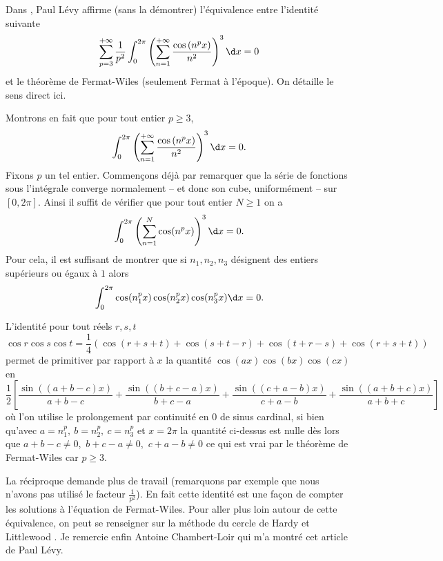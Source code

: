 \documentclass{notes}
\begin{document}

Dans \cite{Levy}, Paul Lévy affirme (sans la démontrer) l'équivalence entre l'identité suivante
\[ \sum_{p=3}^{+\infty} \frac{1}{p^{2}} \int_{0}^{2\pi} \left( \sum_{n=1}^{+\infty} \frac{\cos\left( n^{p }x \right)}{n^{2}} \right)^{3}  \d x = 0  \]
et le théorème de Fermat-Wiles (seulement Fermat à l'époque). On détaille le sens direct ici.

Montrons en fait que pour tout entier $p\geq 3$, 
\[ \int_{0}^{2\pi} \left( \sum_{n=1}^{+\infty} \frac{\cos\left( n^{p }x \right)}{n^{2}} \right)^{3}  \d x = 0 .  \]
Fixons $p$ un tel entier. Commençons déjà par remarquer que la série de fonctions sous l'intégrale converge normalement -- et donc son cube, uniformément -- sur $[0,2\pi]$. Ainsi il suffit de vérifier que pour tout entier $N\geq 1$ on a 
\[  \int_{0}^{2\pi}   \left( \sum_{n=1}^{N} \cos(n^{p}x) \right)^{3} \d x = 0. \]
Pour cela, il est suffisant de montrer que si $n_1,n_2,n_3$ désignent des entiers supérieurs ou égaux à $1$ alors 
\[ \int_{0}^{2\pi} \cos(n_1^{p} x)\cos(n_2^{p}x) \cos(n_3^{p}x) \d x = 0.\]

L'identité pour tout réels $r,s,t$ 
\[\cos r \cos s \cos t = \frac 14 \left( \cos(r+s+t)+\cos(s+t-r) + \cos(t+r-s) + \cos(r+s+t) \right)\]
permet de primitiver par rapport à $x$ la quantité $ \cos(ax)\cos(bx)\cos(cx) $  en 
\[ \frac 12 \left[    \frac{\sin \left( (a+b-c)x \right)  }{a+b-c} + \frac{\sin\left( (b+c-a)x \right)}{b+c-a}  + \frac{\sin\left( (c+a-b) x\right)  }{c+a-b} + \frac{\sin\left( (a+b+c)x \right)}{a+b+c}    \right] \]
où l'on utilise le prolongement par continuité en $0$ de sinus cardinal, si bien qu'avec $a=n_1^{p},\ b=n_2^{p},\ c=n_3^{p}$ et $x=2\pi$ la quantité ci-dessus est nulle dès lors que $a+b-c \neq 0$,\ $b+c-a \neq 0$,\ $c+a-b \neq 0$ ce qui est vrai par le théorème de Fermat-Wiles car $p \geq 3$.  


\begin{rem}
  La réciproque demande plus de travail (remarquons par exemple que nous n'avons pas utilisé le facteur $\frac{1}{p^{2}}$). En fait cette identité est une façon de compter les solutions à l'équation de Fermat-Wiles. Pour aller plus loin autour de cette équivalence, on peut se renseigner sur la méthode du cercle de Hardy et Littlewood \cite{HW}.   Je remercie enfin Antoine Chambert-Loir qui m'a montré cet article de Paul Lévy.
\end{rem}





 
\end{document}
